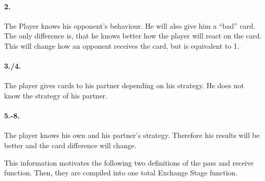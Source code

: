 \paragraph{2.}
The Player knows his opponent’s behaviour. He will also give him a “bad” card. The only difference is, that he knows better how the player will react on the card. This will change how an opponent receives the card, but is equivalent to 1. 
\paragraph{3./4.}
The player gives cards to his partner depending on his strategy. He does not know the strategy of his partner.
\paragraph{5.-8.}
The player knows his own and his partner’s strategy. Therefore his results will be better and the card difference will change.

This information motivates the following two definitions of the pass and receive function. Then, they  are compiled into one total Exchange Stage function. 

